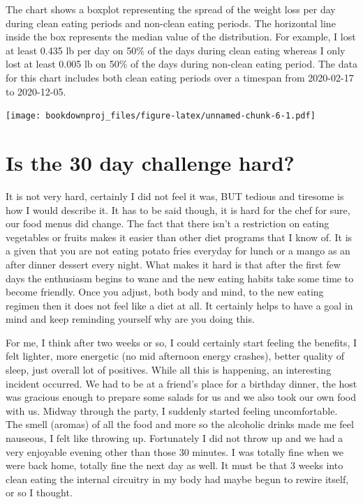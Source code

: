 \documentclass[
  oneside]{book}
\begin{document}
The chart shows a boxplot representing the spread of the weight loss per day during clean eating periods and non-clean eating periods. The horizontal line inside the box represents the median value of the distribution. For example, I lost at least 0.435 lb per day on 50\% of the days during clean eating whereas I only lost at least 0.005 lb on 50\% of the days during non-clean eating period. The data for this chart includes both clean eating periods over a timespan from 2020-02-17 to 2020-12-05.

\texttt{[image: bookdownproj\_files/figure-latex/unnamed-chunk-6-1.pdf]}

\hypertarget{is-the-30-day-challenge-hard}{%
\section{Is the 30 day challenge hard?}\label{is-the-30-day-challenge-hard}}

It is not very hard, certainly I did not feel it was, BUT tedious and tiresome is how I would describe it. It has to be said though, it is hard for the chef for sure, our food menus did change. The fact that there isn't a restriction on eating vegetables or fruits makes it easier than other diet programs that I know of. It is a given that you are not eating potato fries everyday for lunch or a mango as an after dinner dessert every night. What makes it hard is that after the first few days the enthusiasm begins to wane and the new eating habits take some time to become friendly. Once you adjust, both body and mind, to the new eating regimen then it does not feel like a diet at all. It certainly helps to have a goal in mind and keep reminding yourself why are you doing this.

For me, I think after two weeks or so, I could certainly start feeling the benefits, I felt lighter, more energetic (no mid afternoon energy crashes), better quality of sleep, just overall lot of positives. While all this is happening, an interesting incident occurred. We had to be at a friend's place for a birthday dinner, the host was gracious enough to prepare some salads for us and we also took our own food with us. Midway through the party, I suddenly started feeling uncomfortable. The smell (aromas) of all the food and more so the alcoholic drinks made me feel nauseous, I felt like throwing up. Fortunately I did not throw up and we had a very enjoyable evening other than those 30 minutes. I was totally fine when we were back home, totally fine the next day as well. It must be that 3 weeks into clean eating the internal circuitry in my body had maybe begun to rewire itself, or so I thought.
\end{document}
